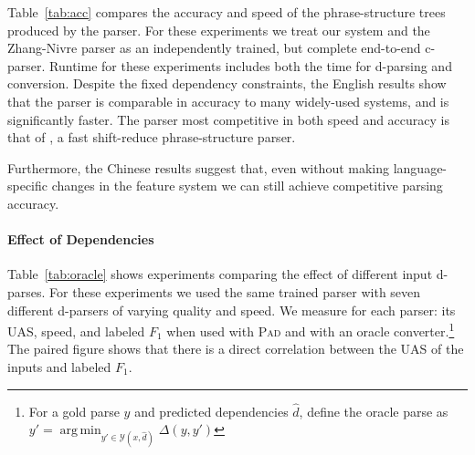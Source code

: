 \documentclass[11pt,letterpaper]{article}
\DeclareMathOperator*{\argmin}{arg\,min}
\newcommand{\ParseName}{\textsc{Pad}\xspace}
\newcommand{\nascomment}[1]{\textcolor{blue}{\bf \small [#1 --nas]}}
\begin{document}
Table~\ref{tab:acc} compares the accuracy and speed of the
phrase-structure trees produced by the parser.  For these experiments
we treat our system and the Zhang-Nivre parser as an independently
trained, but complete end-to-end c-parser. Runtime for these
experiments includes both the time for d-parsing and conversion.
Despite the fixed dependency constraints, the English results show
that the parser is comparable in accuracy to many widely-used systems,
and is significantly faster. The parser most competitive in both speed
and accuracy is that of , a fast shift-reduce
phrase-structure parser.

Furthermore, the Chinese results suggest that, even without making
language-specific changes in the feature system we can still achieve
competitive parsing accuracy.  



\paragraph{Effect of Dependencies}

Table~\ref{tab:oracle} shows experiments comparing the effect of
different input d-parses.  For these experiments we used the same
trained parser with seven different d-parsers of varying quality and
speed. We measure for each parser: its UAS, speed, and labeled $F_1$
when used with \ParseName and with an oracle converter.\footnote{For a
  gold parse $y$ and predicted dependencies $\hat{d}$, define the
  oracle parse as $y' = \argmin_{y' \in \mathcal{Y}(x, \hat{d})}
  \Delta(y, y') $} The paired figure shows that there is a direct
correlation between the UAS of the inputs and labeled $F_1$.

\end{document}
